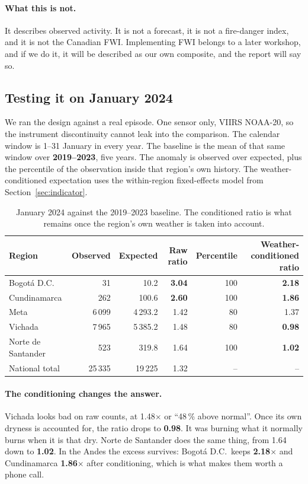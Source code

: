 \documentclass[11pt,a4paper]{article}
\begin{document}
\paragraph{What this is not.} It describes observed activity. It is not a forecast, it is not a
fire-danger index, and it is not the Canadian FWI. Implementing FWI belongs to a later workshop, and
if we do it, it will be described as our own composite, and the report will say so.

\subsection{Testing it on January 2024}

We ran the design against a real episode. One sensor only, VIIRS NOAA-20, so the instrument
discontinuity cannot leak into the comparison. The calendar window is 1--31 January in every year. The
baseline is the mean of that same window over \textbf{2019--2023}, five years. The anomaly is observed
over expected, plus the percentile of the observation inside that region's own history. The
weather-conditioned expectation uses the within-region fixed-effects model from
Section~\ref{sec:indicator}.

\begin{table}[h]
\centering
\small
\begin{tabular}{lrrrrr}
\toprule
\textbf{Region} & \textbf{Observed} & \textbf{Expected} & \textbf{Raw ratio} & \textbf{Percentile} & \textbf{Weather-conditioned ratio} \\
\midrule
Bogotá D.C. & 31 & 10.2 & \textbf{3.04} & 100 & \textbf{2.18} \\
Cundinamarca & 262 & 100.6 & \textbf{2.60} & 100 & \textbf{1.86} \\
Meta & 6\,099 & 4\,293.2 & 1.42 & 80 & 1.37 \\
Vichada & 7\,965 & 5\,385.2 & 1.48 & 80 & \textbf{0.98} \\
Norte de Santander & 523 & 319.8 & 1.64 & 100 & \textbf{1.02} \\
\midrule
National total & 25\,335 & 19\,225 & 1.32 & -- & -- \\
\bottomrule
\end{tabular}
\caption{January 2024 against the 2019--2023 baseline. The conditioned ratio is what remains
once the region's own weather is taken into account.}
\end{table}

\paragraph{The conditioning changes the answer.} Vichada looks bad on raw counts, at 1.48$\times$ or
``48\,\% above normal''. Once its own dryness is accounted for, the ratio drops to \textbf{0.98}. It
was burning what it normally burns when it is that dry. Norte de Santander does the same thing, from
1.64 down to \textbf{1.02}. In the Andes the excess survives: Bogotá D.C.\ keeps \textbf{2.18$\times$}
and Cundinamarca \textbf{1.86$\times$} after conditioning, which is what makes them worth a phone
call.
\end{document}
